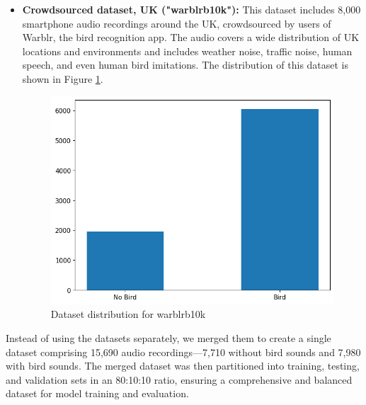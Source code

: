 \begin{itemize}
            \item \textbf{Crowdsourced dataset, UK ("warblrb10k"):} This dataset includes 8,000 smartphone audio recordings around the UK, crowdsourced by users of Warblr, the bird recognition app. The audio covers a wide distribution of UK locations and environments and includes weather noise, traffic noise, human speech, and even human bird imitations. The distribution of this dataset is shown in Figure \ref{fig:warblrb10k dataset}.
            \begin{figure}[h!]
                  \centering
                  \includegraphics[scale=0.45]{images/dataset_detection-2.png}
                  \caption{Dataset distribution for warblrb10k}
                  \label{fig:warblrb10k dataset}
            \end{figure}
      \end{itemize}
      Instead of using the datasets separately, we merged them to create a single dataset comprising 15,690 audio recordings—7,710 without bird sounds and 7,980 
      with bird sounds. The merged dataset was then partitioned into training, testing, and validation sets in an 80:10:10 ratio, ensuring a comprehensive and 
      balanced dataset for model training and evaluation.
